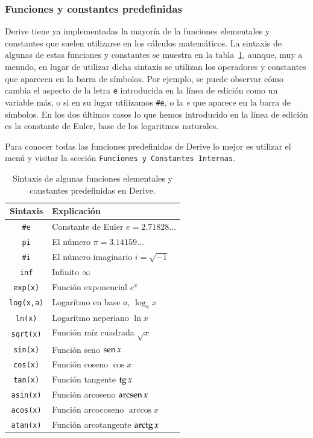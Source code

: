 \subsubsection*{Funciones y constantes predefinidas} Derive tiene ya
implementadas la mayoría de la funciones elementales y constantes
que suelen utilizarse en los cálculos matemáticos. La sintaxis de
algunas de estas funciones y constantes se muestra en la
tabla~\ref{t:funcioneselementales}, aunque, muy a menudo, en lugar
de utilizar dicha sintaxis se utilizan los operadores y constantes
que aparecen en la barra de símbolos. Por ejemplo, se puede
observar cómo cambia el aspecto de la letra \texttt{e} introducida
en la línea de edición como un variable más, o si en su lugar
utilizamos \verb"#"\texttt{e}, o la \emph{e} que aparece en la
barra de símbolos. En los dos últimos casos lo que hemos
introducido en la línea de edición es la constante de Euler, base
de los logaritmos naturales.

Para conocer todas las funciones predefinidas de Derive lo mejor es
utilizar el menú  y visitar la sección
\texttt{Funciones y Constantes Internas}.
\begin{table}[h!]
  \centering
  \begin{tabular}{|c|l|}
\hline
 Sintaxis &            Explicación             \\
\hline\hline
    \verb"#"\texttt{e}     &     Constante de Euler $e=2.71828\ldots$     \\
\hline
    \texttt{pi}    &   El número $\pi=3.14159\ldots$    \\
\hline
    \verb"#"\texttt{i}     & El número imaginario $i=\sqrt{-1}$ \\
\hline
    \texttt{inf} & Infinito $\infty$\\
\hline
  \texttt{exp(x)}  &     Función exponencial $e^x$      \\
\hline
 \texttt{log(x,a)} & Logarítmo en base $a$, $\log_a x$  \\
\hline
  \texttt{ln(x)}   &    Logarítmo neperiano $\ln x$     \\
\hline
 \texttt{sqrt(x)}  &  Función raíz cuadrada $\sqrt{x}$  \\
\hline
  \texttt{sin(x)}  &       Función seno $\operatorname{sen} x$        \\
\hline
  \texttt{cos(x)}  &      Función coseno $\cos x$       \\
\hline
  \texttt{tan(x)}  &      Función tangente $\operatorname{tg} x$      \\
\hline
 \texttt{asin(x)}  &    Función arcoseno $\operatorname{arcsen} x$    \\
\hline
 \texttt{acos(x)}  &   Función arcocoseno $\arccos x$   \\
\hline
 \texttt{atan(x)}  &  Función arcotangente $\operatorname{arctg} x$   \\
\hline
\end{tabular}

  \caption{Sintaxis de algunas funciones elementales y constantes
  predefinidas en Derive.} \label{t:funcioneselementales}
\end{table}

